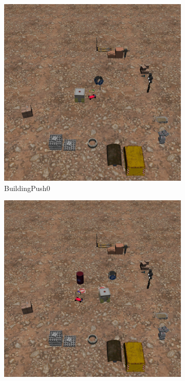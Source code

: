 \documentclass{article}
\begin{document}
\begin{figure}[H]
    \centering
      \begin{subfigure}{0.3\linewidth}
        \centering
        \includegraphics[width=\linewidth]{assets/appendix/building_push0.pdf}
        \caption{BuildingPush0}
      \end{subfigure}
      \begin{subfigure}{0.3\linewidth}
        \centering
        \includegraphics[width=\linewidth]{assets/appendix/building_push1.pdf}

\end{subfigure}
\end{figure}
\end{document}
